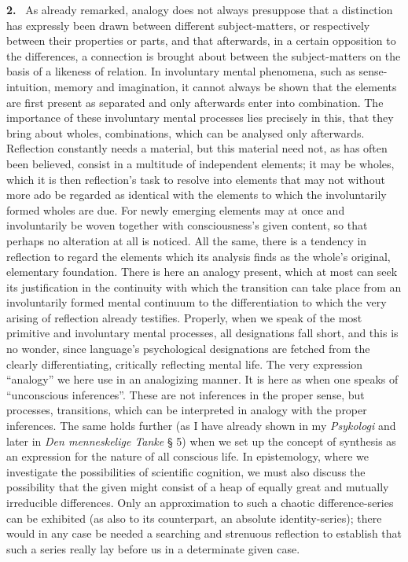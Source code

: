 \documentclass[12pt]{book}
\newcommand{\hnum}[1]{\noindent\textbf{#1.}~}
\newcommand{\opage}[1]{\marginnote{\footnotesize\textit{[#1]}}}
\begin{document}
\hnum{2} As already remarked, analogy does not always presuppose that a
distinction has expressly been drawn between different subject-matters, or
respectively between their properties or parts, and that afterwards, in a
certain opposition to the differences, a connection is brought about between
the subject-matters on the basis of a likeness of relation. In involuntary
mental phenomena, such as sense-intuition, memory and imagination, it cannot
always be shown that the elements are first present as separated and only
afterwards enter into combination. The importance of these involuntary \opage{8}mental
processes lies precisely in this, that they bring about wholes, combinations,
which can be analysed only afterwards. Reflection constantly needs a material,
but this material need not, as has often been believed, consist in a multitude
of independent elements; it may be wholes, which it is then reflection's task
to resolve into elements that may not without more ado be regarded as identical
with the elements to which the involuntarily formed wholes are due. For newly
emerging elements may at once and involuntarily be woven together with
consciousness's given content, so that perhaps no alteration at all is noticed.
All the same, there is a tendency in reflection to regard the elements which
its analysis finds as the whole's original, elementary foundation. There is
here an analogy present, which at most can seek its justification in the
continuity with which the transition can take place from an involuntarily
formed mental continuum to the differentiation to which the very arising of
reflection already testifies. Properly, when we speak of the most primitive and
involuntary mental processes, all designations fall short, and this is no
wonder, since language's psychological designations are fetched from the
clearly differentiating, critically reflecting mental life. The very expression
``analogy'' we here use in an analogizing manner. It is here as when one speaks
of ``unconscious inferences''. These are not inferences in the proper sense,
but processes, transitions, which can be interpreted in analogy with the proper
inferences. The same holds further (as I have already shown in my
\textit{Psykologi} and later in \textit{Den menneskelige Tanke} § 5) when we
set up the concept of synthesis as an expression for the nature of all
conscious life. In epistemology, where we investigate the possibilities of
scientific cognition, we must also discuss the possibility that the given might
consist of \opage{9}a heap of equally great and mutually irreducible differences. Only
an approximation to such a chaotic difference-series can be exhibited (as also
to its counterpart, an absolute identity-series); there would in any case be
needed a searching and strenuous reflection to establish that such a series
really lay before us in a determinate given case.
\end{document}
